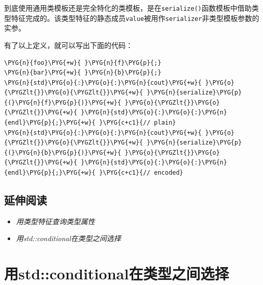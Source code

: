 
到底使用通用类模板还是完全特化的类模板，是在\texttt{serialize()}函数模板中借助类型特征完成的。该类型特征的静态成员\texttt{value}被用作\texttt{serializer}非类型模板参数的实参。



有了以上定义，就可以写出下面的代码：



\begin{codeblockbg}
\begin{Verbatim}[commandchars=\\\{\},breaklines=true,breakanywhere=true,fontsize=\codefont,xleftmargin=17bp]
\PYG{n}{foo}\PYG{+w}{ }\PYG{n}{f}\PYG{p}{;}
\PYG{n}{bar}\PYG{+w}{ }\PYG{n}{b}\PYG{p}{;}
\PYG{n}{std}\PYG{o}{:}\PYG{o}{:}\PYG{n}{cout}\PYG{+w}{ }\PYG{o}{\PYGZlt{}}\PYG{o}{\PYGZlt{}}\PYG{+w}{ }\PYG{n}{serialize}\PYG{p}{(}\PYG{n}{f}\PYG{p}{)}\PYG{+w}{ }\PYG{o}{\PYGZlt{}}\PYG{o}{\PYGZlt{}}\PYG{+w}{ }\PYG{n}{std}\PYG{o}{:}\PYG{o}{:}\PYG{n}{endl}\PYG{p}{;}\PYG{+w}{ }\PYG{c+c1}{// plain}
\PYG{n}{std}\PYG{o}{:}\PYG{o}{:}\PYG{n}{cout}\PYG{+w}{ }\PYG{o}{\PYGZlt{}}\PYG{o}{\PYGZlt{}}\PYG{+w}{ }\PYG{n}{serialize}\PYG{p}{(}\PYG{n}{b}\PYG{p}{)}\PYG{+w}{ }\PYG{o}{\PYGZlt{}}\PYG{o}{\PYGZlt{}}\PYG{+w}{ }\PYG{n}{std}\PYG{o}{:}\PYG{o}{:}\PYG{n}{endl}\PYG{p}{;}\PYG{+w}{ }\PYG{c+c1}{// encoded}
\end{Verbatim}
\end{codeblockbg}



\subsection{延伸阅读}



\begin{itemize}
\item \textit{用类型特征查询类型属性}



\item \textit{用std::conditional在类型之间选择}

\end{itemize}



\section{用std::conditional在类型之间选择}


